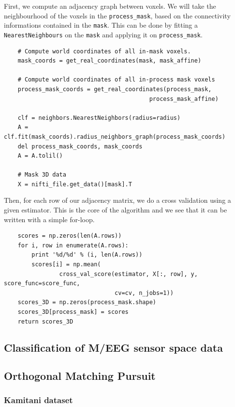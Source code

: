 \documentclass{frontiersSCNS} %
\newcommand{\alex}[1]{\todo[inline, color=green!40]{#1}}
\begin{document}
First, we compute an adjacency graph between voxels. We will take the
neighbourhood of the voxels in the \verb!process_mask!, based on the
connectivity informations contained in the \verb!mask!. This can be done by
fitting a \verb!NearestNeighbours! on the \verb!mask! and applying it on
\verb!process_mask!. \alex{TODO: reformulate}

\begin{lstlisting}
    # Compute world coordinates of all in-mask voxels.
    mask_coords = get_real_coordinates(mask, mask_affine)

    # Compute world coordinates of all in-process mask voxels
    process_mask_coords = get_real_coordinates(process_mask,
                                          process_mask_affine)

    clf = neighbors.NearestNeighbors(radius=radius)
    A = clf.fit(mask_coords).radius_neighbors_graph(process_mask_coords)
    del process_mask_coords, mask_coords
    A = A.tolil()

    # Mask 3D data
    X = nifti_file.get_data()[mask].T
\end{lstlisting}

Then, for each row of our adjacency matrix, we do a cross validation using a
given estimator. This is the core of the algorithm and we see that it can be
written with a simple for-loop.

\begin{lstlisting}
    scores = np.zeros(len(A.rows))
    for i, row in enumerate(A.rows):
        print '%d/%d' % (i, len(A.rows))
        scores[i] = np.mean(
                cross_val_score(estimator, X[:, row], y, score_func=score_func,
                                cv=cv, n_jobs=1))
    scores_3D = np.zeros(process_mask.shape)
    scores_3D[process_mask] = scores
    return scores_3D
\end{lstlisting}


\subsection{Classification of M/EEG sensor space data}


\subsection{Orthogonal Matching Pursuit}

\subsubsection{Kamitani dataset}
\end{document}
